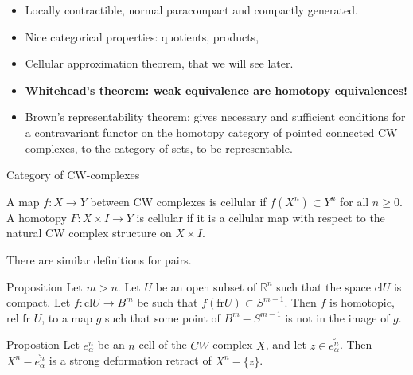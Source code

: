 \documentclass{beamer}
\begin{document}
\begin{frame}
    \begin{itemize}
        \setlength\itemsep{1.5em}
        \item Locally contractible, normal paracompact and compactly generated.
        \item Nice categorical properties: quotients, products,
        \item Cellular approximation theorem, that we will see later.
        \item \textbf{Whitehead's theorem: weak equivalence are homotopy equivalences!}
        \item Brown's representability theorem: gives necessary and sufficient conditions for a contravariant functor on the homotopy category of pointed connected CW complexes, to the category of sets, to be representable.
    \end{itemize}
\end{frame}

\begin{frame}{Category of CW-complexes}

A map $f: X \rightarrow Y$ between CW complexes is cellular if $f\left(X^n\right) \subset Y^n$ for all $n \geq 0$.\\
\bigskip
A homotopy $F: X \times I \rightarrow Y$ is cellular if it is a cellular map with respect to the natural CW complex structure on $X \times I$.\\
\bigskip

There are similar definitions for pairs.

\end{frame}

\begin{frame}

\begin{block}{Proposition}
Let $m>n$. Let $U$ be an open subset of $\mathbb{R}^n$ such that the space $\mathrm{cl} U$ is compact. Let $f: \mathrm{cl} U \rightarrow B^m$ be such that $f(\mathrm{fr} U) \subset S^{m-1}$. Then $f$ is homotopic, rel fr $U$, to a map $g$ such that some point of $B^m-S^{m-1}$ is not in the image of $g$.

\end{block}

\bigskip

    \begin{block}{Propostion}
Let $e_\alpha^n$ be an $n$-cell of the $C W$ complex $X$, and let $z \in \overset{\circ}{e^n _\alpha}$. Then $X^n-\overset{\circ}{e^n _\alpha} $ is a strong deformation retract of $X^n-\{z\}$.
    \end{block}
\end{frame}
\end{document}
